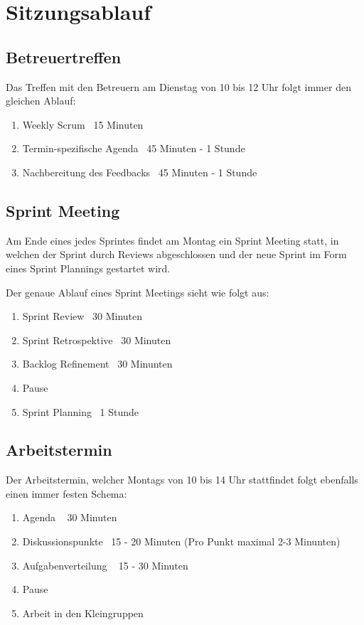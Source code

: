 \section{Sitzungsablauf}
\subsection{Betreuertreffen}
Das Treffen mit den Betreuern am Dienstag von 10 bis 12 Uhr folgt immer den gleichen Ablauf:
\begin{enumerate}
	\item Weekly Scrum ~15 Minuten
	\item Termin-spezifische Agenda ~45 Minuten - 1 Stunde
	\item Nachbereitung des Feedbacks ~45 Minuten - 1 Stunde
\end{enumerate}

\subsection{Sprint Meeting}
Am Ende eines jedes Sprintes findet am Montag ein Sprint Meeting statt, in welchen der Sprint durch Reviews abgeschlossen und der neue Sprint im Form eines Sprint Plannings gestartet wird.

Der genaue Ablauf eines Sprint Meetings sieht wie folgt aus:
\begin{enumerate}
	\item Sprint Review ~30 Minuten
	\item Sprint Retrospektive ~30 Minuten
	\item Backlog Refinement ~30 Minunten
	\item Pause
	\item Sprint Planning ~1 Stunde
\end{enumerate}

\subsection{Arbeitstermin}
Der Arbeitstermin, welcher Montags von 10 bis 14 Uhr stattfindet folgt ebenfalls einen immer festen Schema:
\begin{enumerate}
	\item Agenda ~ 30 Minuten
	\item Diskussionspunkte ~15 - 20 Minuten (Pro Punkt maximal 2-3 Minunten)
	\item Aufgabenverteilung ~ 15 - 30 Minuten
	\item Pause
	\item Arbeit in den Kleingruppen
\end{enumerate}